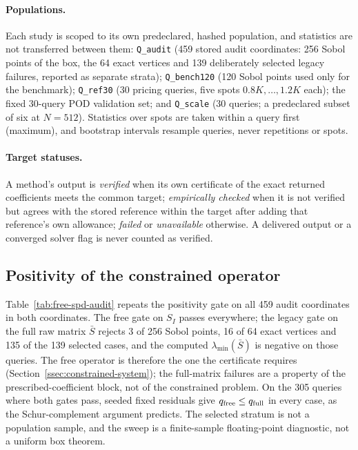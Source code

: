 \documentclass[11pt]{amsart}
\theoremstyle{remark}
\begin{document}
\paragraph{Populations.} Each study is scoped to its own predeclared,
hashed population, and statistics are not transferred between them:
\texttt{Q\_audit} (459 stored audit coordinates: 256 Sobol points of the
box, the 64 exact vertices and 139 deliberately selected legacy failures,
reported as separate strata); \texttt{Q\_bench120} (120 Sobol points used
only for the benchmark); \texttt{Q\_ref30} (30 pricing queries, five spots
$0.8K,\dots,1.2K$ each); the fixed 30-query POD validation set; and
\texttt{Q\_scale} (30 queries; a predeclared subset of six at $N=512$).
Statistics over spots are taken within a query first (maximum), and
bootstrap intervals resample queries, never repetitions or spots.

\paragraph{Target statuses.} A method's output is \emph{verified} when its
own certificate of the exact returned coefficients meets the common target;
\emph{empirically checked} when it is not verified but agrees with the
stored reference within the target after adding that reference's own
allowance; \emph{failed} or \emph{unavailable} otherwise. A delivered output
or a converged solver flag is never counted as verified.

\subsection{Positivity of the constrained operator}
\label{ssec:audit-results}

Table~\ref{tab:free-spd-audit} repeats the positivity gate on all 459 audit
coordinates in both coordinates. The free gate on $S_I$ passes everywhere;
the legacy gate on the full raw matrix $\bar S$ rejects 3 of 256 Sobol
points, 16 of 64 exact vertices and 135 of the 139 selected cases, and the
computed $\lambda_{\min}(\bar S)$ is negative on those queries. The free
operator is therefore the one the certificate requires
(Section~\ref{ssec:constrained-system}); the full-matrix failures are a
property of the prescribed-coefficient block, not of the constrained
problem. On the 305 queries where both gates pass, seeded fixed residuals
give $q_{\rm free}\le q_{\rm full}$ in every case, as the Schur-complement
argument predicts. The selected stratum is not a population sample, and the
sweep is a finite-sample floating-point diagnostic, not a uniform box
theorem.
\end{document}

